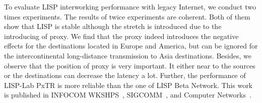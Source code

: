\begin{enumerate}[noitemsep,topsep=0pt]
	To evaluate LISP interworking performance with legacy Internet, we conduct two times experiments. The results of twice experiments are coherent. Both of them show that LISP is stable although the stretch is introduced due to the introducing of proxy. We find that the proxy indeed introduces the negative effects for the destinations located in Europe and America, but can be ignored for the intercontinental long-distance transmission to Asia destinations. Besides, we observe that the position of proxy is very important. It either near to the sources or the destinations can decrease the latency a lot. Further, the performance of LISP-Lab PxTR is more reliable than the one of LISP Beta Network. This work is published in INFOCOM WKSHPS~\cite{li2016using}, SIGCOMM~\cite{li2016performance}, and Computer Networks~\cite{Li2017}.
	
\end{enumerate}	


